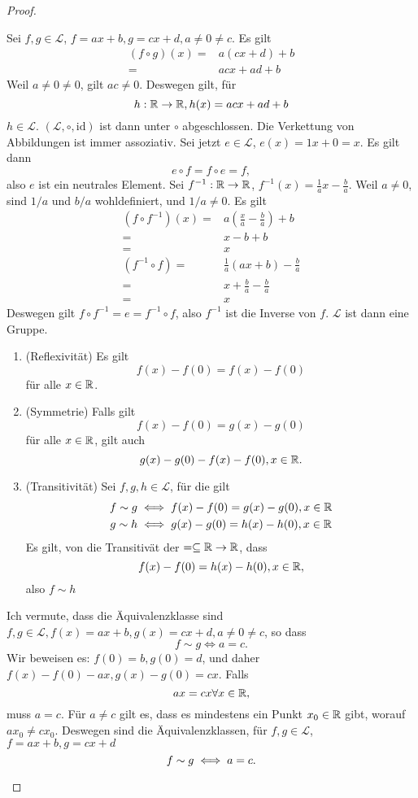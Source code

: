 \begin{proof}
	\begin{parts}
	\item Sei $f,g\in \mathcal{L}$, $f=ax+b, g=cx+d, a\neq 0 \neq c$. Es gilt
		 \begin{align*}
			 (f\circ g)(x)=&a(cx+d)+b\\
			 =&acx+ad+b
		\end{align*}
		Weil $a\neq 0 \neq 0$, gilt $ac\neq 0$. Deswegen gilt, f\"{u}r
		\[
		h:\mathbb{R}\to \mathbb{R}, h(x)=acx+ad+b
		\]
		$h\in \mathcal{L}$. $(\mathcal{L},\circ,\text{id})$ ist dann unter $\circ$ abgeschlossen. Die Verkettung von Abbildungen ist immer assoziativ. Sei jetzt $e\in \mathcal{L}$, $e(x)=1x+0=x$. Es gilt dann
		\[
		e\circ f = f\circ e=f
		,\]
		also $e$ ist ein neutrales Element. Sei $f^{-1}:\mathbb{R}\to \mathbb{R}$, $f^{-1}(x)=\frac{1}{a}x-\frac{b}{a}$. Weil $a\neq 0$, sind $1 / a$ und $b / a$ wohldefiniert, und $1 / a\neq 0$. Es gilt
		\begin{align*}
			(f\circ f^{-1})(x)=& a\left( \frac{x}{a}-\frac{b}{a} \right) +b\\
			=& x-b+b\\
			=&x\\
			\left( f^{-1}\circ f \right) =& \frac{1}{a}\left( ax+b \right) -\frac{b}{a}\\
			=& x+\frac{b}{a}-\frac{b}{a}\\
			=&x
		\end{align*}
		Deswegen gilt $f\circ f^{-1}=e=f^{-1}\circ f$, also $f^{-1}$ ist die Inverse von $f$. $\mathcal{L}$ ist dann eine Gruppe.
	\item 
		\begin{enumerate}[label=(\roman*)]
			\item (Reflexivität) Es gilt
				\[
				f(x)-f\left(0 \right) =f(x)-f(0)
				\]
				f\"{u}r alle $x\in \mathbb{R}$.
			\item (Symmetrie) Falls gilt
				\[
				f(x)-f(0)=g(x)-g(0)
				\]
				f\"{u}r alle $x\in \mathbb{R}$, gilt auch
				 \[
				g(x)-g(0)-f(x)-f(0), x\in \mathbb{R}
				.\] 
			\item (Transitivität) Sei $f,g,h\in \mathcal{L}$, f\"{u}r die gilt
				\begin{gather*}
					f\sim g \iff f(x)-f(0)=g(x)-g(0), x\in \mathbb{R}\\
					g\sim h \iff g(x)-g(0)=h(x)-h(0), x\in \mathbb{R}
				\end{gather*}
				Es gilt, von die Transitivät der $=\subseteq \mathbb{R}\to \mathbb{R}$, dass
				\[
				f(x)-f(0)=h(x)-h(0), x\in \mathbb{R}
				,\]
				also $f\sim h$
		\end{enumerate}
		Ich vermute, dass die Äquivalenzklasse sind $f,g\in \mathcal{L},f(x)=ax+b,g(x)=cx+d,a\neq 0 \neq c$, so dass
		\[
		f\sim g \iff a = c
		.\]
		Wir beweisen es: $f(0)=b, g(0)=d$, und daher $f(x)-f(0)-ax, g(x)-g(0)=cx$. Falls
		\[
		ax=cx\forall x\in \mathbb{R}
		,\]
		muss $a=c$.  F\"{u}r $a\neq c$ gilt es, dass es mindestens ein Punkt $x_0\in \mathbb{R}$ gibt, worauf $ax_0\neq cx_0$. Deswegen sind die Äquivalenzklassen, f\"{u}r $f,g\in \mathcal{L}$, $f=ax+b,g=cx+d$
		 \[
		f\sim g \iff a = c
		.\qedhere\] 
	\end{parts}
\end{proof}
